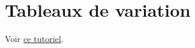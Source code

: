 
\section{Tableaux de variation}

    Voir \href{https://zestedesavoir.com/tutoriels/439/des-tableaux-de-variations-et-de-signes-avec-latex/}{ce tutoriel}.

    \begin{latexcode}
    \end{latexcode}